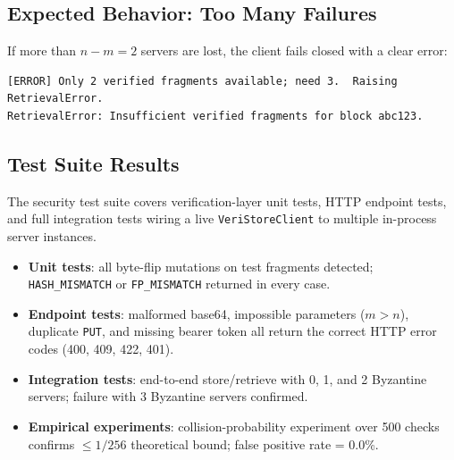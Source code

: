 \documentclass[10pt]{article}
\begin{document}
\subsection{Expected Behavior: Too Many Failures}

If more than $n - m = 2$ servers are lost, the client fails closed with a clear error:

\begin{lstlisting}
[ERROR] Only 2 verified fragments available; need 3.  Raising RetrievalError.
RetrievalError: Insufficient verified fragments for block abc123.
\end{lstlisting}

\subsection{Test Suite Results}

The security test suite covers verification-layer unit tests, HTTP endpoint tests, and
full integration tests wiring a live \texttt{VeriStoreClient} to multiple in-process
server instances.

\begin{itemize}
  \item \textbf{Unit tests}: all byte-flip mutations on test fragments detected;
        \texttt{HASH\_MISMATCH} or \texttt{FP\_MISMATCH} returned in every case.
  \item \textbf{Endpoint tests}: malformed base64, impossible parameters
        ($m > n$), duplicate \texttt{PUT}, and missing bearer token all return the correct
        HTTP error codes (400, 409, 422, 401).
  \item \textbf{Integration tests}: end-to-end store/retrieve with 0, 1, and 2
        Byzantine servers; failure with 3 Byzantine servers confirmed.
  \item \textbf{Empirical experiments}: collision-probability experiment over 500 checks
        confirms $\leq 1/256$ theoretical bound; false positive rate = 0.0\%.
\end{itemize}
\end{document}
